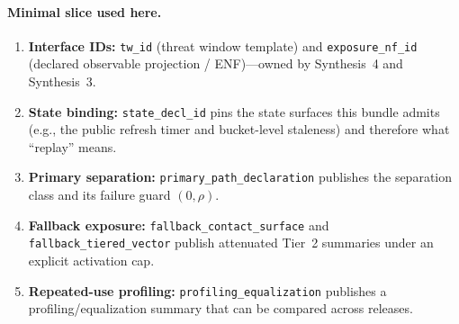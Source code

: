 \documentclass[11pt]{article}
\begin{document}
\paragraph{Minimal slice used here.}
\begin{enumerate}[leftmargin=*]
\item \textbf{Interface IDs:} \texttt{tw\_id} (threat window template) and \texttt{exposure\_nf\_id} (declared observable projection / ENF)---owned by Synthesis~4 and Synthesis~3.\cite{series:threatwindows,series:traceifaces}
\item \textbf{State binding:} \texttt{state\_decl\_id} pins the state surfaces this bundle admits (e.g., the public refresh timer and bucket-level staleness) and therefore what ``replay'' means.\cite{series:planstateequiv}
\item \textbf{Primary separation:} \texttt{primary\_path\_declaration} publishes the separation class and its failure guard $(0,\rho)$.\cite{series:primarysepmanifest,series:probsep}
\item \textbf{Fallback exposure:} \texttt{fallback\_contact\_surface} and \texttt{fallback\_tiered\_vector} publish attenuated Tier~2 summaries under an explicit activation cap.\cite{series:obsatten,series:fallbacktax,series:tieredobs}
\item \textbf{Repeated-use profiling:} \texttt{profiling\_equalization} publishes a profiling/equalization summary that can be compared across releases.\cite{series:profiling}
\end{enumerate}
\end{document}
